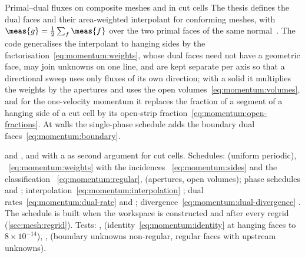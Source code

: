 \begin{deviation}{Primal--dual fluxes on composite meshes and in cut cells}
The thesis defines the dual faces and their area-weighted interpolant for
conforming meshes, with $\meas{g}=\half\sum_{f}\meas{f}$ over the two primal
faces of the same normal~. The code generalises
the interpolant to hanging sides by the factorisation~\cref{eq:momentum:weights},
whose dual faces need not have a geometric face, may join unknowns on one
line, and are kept separate per axis so that a directional sweep uses only
fluxes of its own direction; with a solid it multiplies the weights by the
apertures and uses the open volumes~\cref{eq:momentum:volumes}, and for the
one-velocity momentum it replaces the fraction of a segment of a hanging side
of a cut cell by its open-strip fraction~\cref{eq:momentum:open-fractions}.
At walls the single-phase schedule adds the boundary dual
faces~\cref{eq:momentum:boundary}.
\end{deviation}

\begin{implnote}
 and
, and with a
 as second argument for cut cells. Schedules:
(uniform periodic), ~\cref{eq:momentum:weights}
with the incidences ~\cref{eq:momentum:sides}
and the classification ~\cref{eq:momentum:regular},
 (apertures, open
volumes); phase schedules 
and ;
interpolation~\cref{eq:momentum:interpolation}
; dual
rates~\cref{eq:momentum:dual-rate} 
and ;
divergence~\cref{eq:momentum:dual-divergence}
.
The schedule is built when the workspace is constructed and after every
regrid (\cref{sec:mesh:regrid}). Tests:
,
(identity~\cref{eq:momentum:identity} at hanging faces to $8\times10^{-14}$),
,
(boundary unknowns non-regular, regular faces with upstream unknowns).
\end{implnote}

